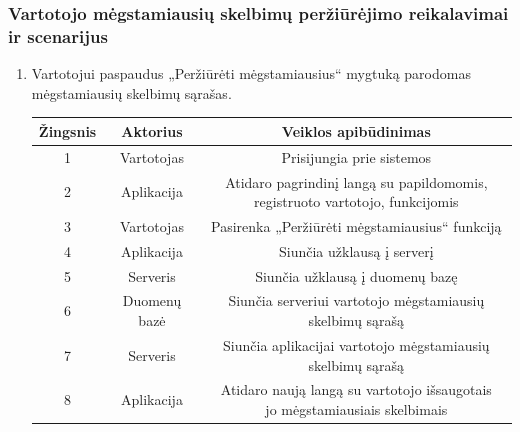 \documentclass[12pt]{article}
\begin{document}
	\subsubsection{Vartotojo mėgstamiausių skelbimų peržiūrėjimo reikalavimai ir scenarijus}
	\begin{enumerate}
		\item Vartotojui paspaudus „Peržiūrėti mėgstamiausius“ mygtuką parodomas mėgstamiausių skelbimų sąrašas.
		
		\begin{center}
		\begin{tabular}{ | c | c | c | }
			\hline
			Žingsnis & Aktorius     & Veiklos apibūdinimas \\ \hline
			1        & Vartotojas   & Prisijungia prie sistemos \\ \hline
			2        & Aplikacija   & \makecell{Atidaro pagrindinį langą su papildomomis, \\ registruoto vartotojo, funkcijomis} \\ \hline
			3        & Vartotojas   & Pasirenka „Peržiūrėti mėgstamiausius“ funkciją \\ \hline
			4        & Aplikacija   & Siunčia užklausą į serverį \\ \hline
			5        & Serveris     & Siunčia užklausą į duomenų bazę \\ \hline
			6        & Duomenų bazė & Siunčia serveriui vartotojo mėgstamiausių skelbimų sąrašą \\ \hline
			7        & Serveris     & Siunčia aplikacijai vartotojo mėgstamiausių skelbimų sąrašą \\ \hline
			8        & Aplikacija   & \makecell{Atidaro naują langą su vartotojo išsaugotais \\ jo mėgstamiausiais skelbimais } \\ \hline
		\end{tabular}
		\end{center}		
	\end{enumerate}	
	\pagebreak
	
\end{document}
